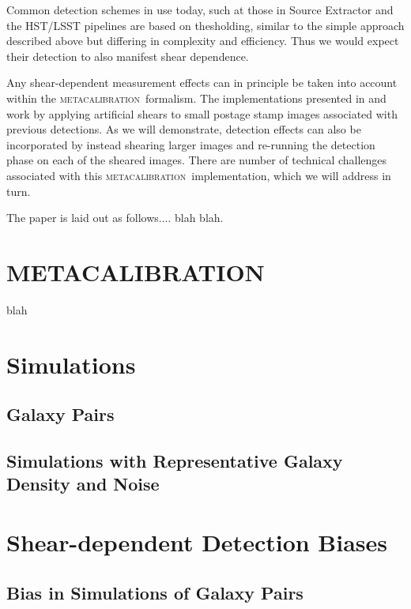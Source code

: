 \documentclass[fleqn,useAMS,usenatbib]{mnras}
\newcommand{\mcal}{\textsc{metacalibration}}
\begin{document}
Common detection schemes in use today, such at those in Source Extractor
\citep{Bertin96} and the HST/LSST pipelines \citep{BoschHSC2018,BoschLSST2018}
are based on thesholding, similar to the simple approach described above but
differing in complexity and efficiency.  Thus we would expect their detection
to also manifest shear dependence.

Any shear-dependent measurement effects can in principle be taken into account
within the \mcal\ formalism.  The implementations presented in
\cite{HuffMcal2017} and \cite{SheldonMcal2017} work by applying artificial
shears to small postage stamp images associated with previous detections.  As
we will demonstrate, detection effects can also be incorporated by instead
shearing larger images and re-running the detection phase on each of the
sheared images. There are number of technical challenges associated with this
\mcal\ implementation, which we will address in turn.

The paper is laid out as follows.... blah blah.


\section{\textsc{METACALIBRATION}}

blah

\section{Simulations}

\subsection{Galaxy Pairs}

\subsection{Simulations with Representative Galaxy Density and Noise}

\section{Shear-dependent Detection Biases}

\subsection{Bias in Simulations of Galaxy Pairs}
\end{document}
